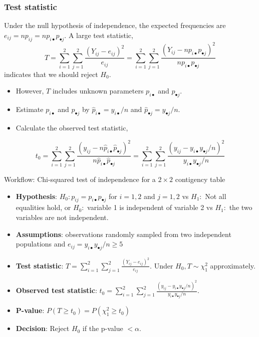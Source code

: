 \documentclass[a4paper]{article}
\begin{document}
\subsubsection{Test statistic}
Under the null hypothesis of independence, the expected frequencies are \( e_{ij} = np_{ij} = np_{i \bullet}p_{\bullet j} \).
A large test statistic,
\[ 
	T = \sum_{i=1}^{2} \sum_{j=1}^{2} \frac{(Y_{ij} - e_{ij})^2}{e_{ij}} =  \sum_{i=1}^{2} \sum_{j=1}^{2} \frac{(Y_{ij} - np_{i \bullet}p_{\bullet j})^2}{np_{i \bullet}p_{\bullet j}}
\] 
indicates that we should reject \( H_0 \).
\begin{itemize}
	\item However, \( T \) includes unknown parameters \( p_{i \bullet} \) and \( p_{\bullet j} \).
	\item Estimate \( p_{i \bullet} \) and \( p_{\bullet j} \) by \( \hat{p}_{i \bullet} = y_{i \bullet}/n \) and \( \hat{p}_{\bullet j} = y_{\bullet j}/n \).
	\item Calculate the observed test statistic,
\end{itemize}
\[
	t_0 = \sum_{i=1}^{2} \sum_{j=1}^{2} \frac{(y_{ij} - n\hat{p}_{i \bullet}\hat{p}_{\bullet j})^2}{n\hat{p}_{i \bullet}\hat{p}_{\bullet j}} = \sum\limits_{i=1}^{2} \sum\limits_{j=1}^{2} \frac{(y_{ij} - y_{i \bullet}y_{\bullet j}/n)^2}{y_{i \bullet}y_{\bullet j}/n}
\]
\begin{redbox}{Workflow: Chi-squared test of independence for a \( 2 \times 2 \) contigency table}
	\begin{itemize}
		\item \textbf{Hypothesis}: \( H_0: p_{ij} = p_{i \bullet} p_{\bullet j} \) for \( i = 1,2 \) and \( j = 1,2 \) vs \( H_1: \) Not all equalities hold, or \( H_0: \) variable 1 is independent of variable 2 vs \( H_1: \) the two variables are not independent.
		\item \textbf{Assumptions}: observations randomly sampled from two independent populations and \( e_{ij} =y_{i \bullet} y_{\bullet j}/n \geq 5 \)
		\item \textbf{Test statistic}: \( T = \sum\limits_{i=1}^{2}\sum\limits_{j=1}^{2} \frac{(Y_{ij} - e_{ij})^2}{e_{ij}} \). Under \( H_0, T \sim \chi^2_1 \) approximately.
		\item \textbf{Observed test statistic}: \( t_0 = \sum\limits_{i=1}^{2} \sum\limits_{j=1}^{2} \frac{(y_{ij} - y_{i \bullet}y_{\bullet j}/n)^2}{y_{i \bullet}y_{\bullet j}/n} \).
		\item \textbf{P-value}: \( P(T\geq t_0) = P(\chi^2_1 \geq t_0) \)
		\item \textbf{Decision}: Reject \( H_0 \) if the p-value \( < \alpha \).
	\end{itemize}
\end{redbox}
\end{document}
